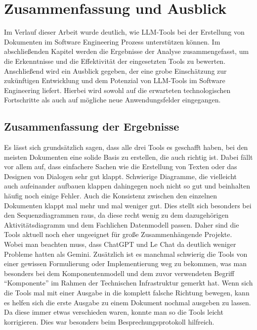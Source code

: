 
\chapter{Zusammenfassung und Ausblick} 

Im Verlauf dieser Arbeit wurde deutlich, wie LLM-Tools bei der Erstellung von Dokumenten im Software Engineering 
Prozess unterstützen können. Im abschließenden Kapitel werden die Ergebnisse der Analyse zusammengefasst, um die 
Erkenntnisse und die Effektivität der eingesetzten Tools zu bewerten. Anschließend wird ein Ausblick gegeben, der 
eine grobe Einschätzung zur zukünftigen Entwicklung und dem Potenzial von LLM-Tools im Software Engineering liefert. 
Hierbei wird sowohl auf die erwarteten technologischen Fortschritte als auch auf mögliche neue Anwendungsfelder 
eingegangen.

\section{Zusammenfassung der Ergebnisse}  \label{Zusammenfassung der Ergebnisse}

Es lässt sich grundsätzlich sagen, dass alle drei Tools es geschafft haben, bei den meisten Dokumenten eine solide 
Basis zu erstellen, die auch richtig ist. Dabei fällt vor allem auf, dass einfachere Sachen wie die Erstellung von 
Texten oder das Designen von Dialogen sehr gut klappt. Schwierige Diagramme, die vielleicht auch aufeinander 
aufbauen klappen dahingegen noch nicht so gut und beinhalten häufig noch einige Fehler. Auch die Konsistenz 
zwischen den einzelnen Dokumenten klappt mal mehr und mal weniger gut. Dies stellt sich besonders bei den 
Sequenzdiagrammen raus, da diese recht wenig zu dem dazugehörigen Aktivitätsdiagramm und dem Fachlichen 
Datenmodell passen. Daher sind die Tools aktuell noch eher ungeeignet für große Zusammenhängende Projekte. Wobei 
man beachten muss, dass ChatGPT und Le Chat da deutlich weniger Probleme hatten als Gemini. 
Zusätzlich ist es manchmal schwierig die Tools von einer gewissen Formulierung oder 
Implementierung weg zu bekommen, was man besonders bei dem Komponentenmodell und dem zuvor verwendeten Begriff 
``Komponente'' im Rahmen der Technischen Infrastruktur gemerkt hat. Wenn sich die Tools mal mit einer Ausgabe in 
die komplett falsche Richtung bewegen, kann es helfen sich die erste Ausgabe zu einem Dokument nochmal ausgeben zu 
lassen. Da diese immer etwas verschieden waren, konnte man so die Tools leicht korrigieren. Dies war besonders 
beim Besprechungsprotokoll hilfreich. 

